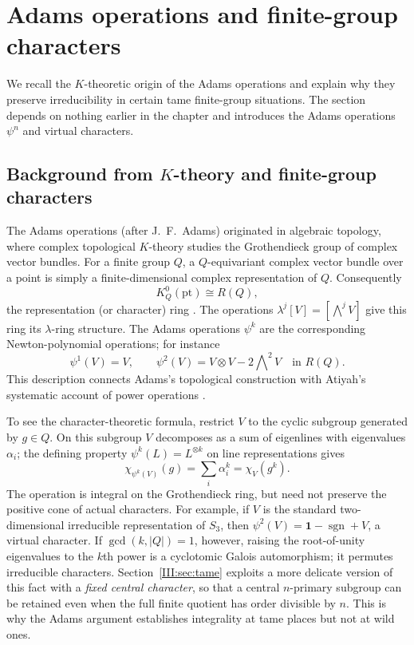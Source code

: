 \section{Adams operations and finite-group characters}\label{III:sec:adams}
We recall the $K$-theoretic origin of the Adams operations and
explain why they preserve irreducibility in certain tame
finite-group situations. The section depends on nothing earlier in the chapter and introduces the Adams operations $\psi^n$ and virtual characters.
\subsection*{Background from $K$-theory and finite-group characters}
The Adams operations (after J.~F.~Adams) originated in algebraic topology, where complex topological
$K$-theory studies the Grothendieck group of complex vector bundles. For a finite
group $Q$, a $Q$-equivariant complex vector bundle over a point is simply a
finite-dimensional complex representation of $Q$. Consequently
\[
K_Q^0(\mathrm{pt})\cong R(Q),
\]
the representation (or character) ring \cite{Seg68}. The operations
$\lambda^j[V]=[\bigwedge^jV]$ give this ring its $\lambda$-ring structure.
The Adams operations $\psi^k$ are the corresponding Newton-polynomial
operations; for instance
\[
\psi^1(V)=V,\qquad
\psi^2(V)=V\otimes V-2\bigwedge\nolimits^2V
\quad\text{in }R(Q).
\]
This description connects Adams's topological construction \cite{Ada62}
with Atiyah's systematic account of power operations \cite{Ati66}.

To see the character-theoretic formula, restrict $V$ to the cyclic subgroup
generated by $g\in Q$. On this subgroup $V$ decomposes as a sum of eigenlines
with eigenvalues $\alpha_i$; the defining property $\psi^k(L)=L^{\otimes k}$
on line representations gives
\begin{equation}\label{III:eq:adams-def-background}
\boxed{\quad\chi_{\psi^k(V)}(g)=\sum_i\alpha_i^k
      =\chi_V(g^k).\quad}
\end{equation}
The operation is integral on the Grothendieck ring, but need not preserve the
positive cone of actual characters. For example, if $V$ is the standard
two-dimensional irreducible representation of $S_3$, then
$\psi^2(V)=\mathbf1-\operatorname{sgn}+V$, a virtual character.
If $\gcd(k,|Q|)=1$, however, raising the root-of-unity eigenvalues to the
$k$th power is a cyclotomic Galois automorphism; it permutes irreducible
characters. Section~\ref{III:sec:tame} exploits a more delicate version of this
fact with a \emph{fixed central character}, so that a central $n$-primary
subgroup can be retained even when the full finite quotient has order
divisible by $n$. This is why the Adams argument establishes integrality at
tame places but not at wild ones.

